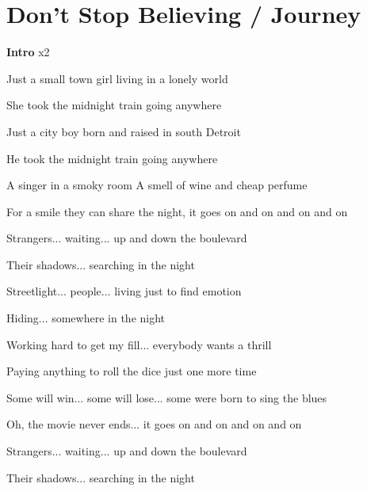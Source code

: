 \section{Don't Stop Believing / Journey}\label{sec:dontstopbelieving}
\DmajorEasy
\Amajor
\Bminor
\Gmajor
\FsharpMinor

\textbf{Intro}     x2

Just a small town girl  living in a lonely world

She took the midnight train going anywhere 

Just a city boy  born and raised in south Detroit

He took the midnight train going anywhere 

   

   

 A singer in a smoky room  A smell of wine and cheap perfume

 For a smile they can share the night, it goes on and on and on and on

Strangers... waiting...  up and down the boulevard

Their shadows... searching in the night

Streetlight... people...  living just to find emotion

Hiding... somewhere in the night

 Working hard to get my fill...  everybody wants a thrill

 Paying anything to roll the dice just one more time 

 Some will win...  some will lose...  some were born to sing the blues

 Oh, the movie never ends... it goes on and on and on and on

Strangers... waiting...  up and down the boulevard

Their shadows... searching in the night

